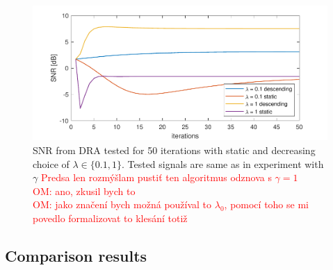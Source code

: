 \documentclass[conference]{IEEEtran}
\newcommand{\todo}[1]{\textcolor{red}{#1}}
\begin{document}
\begin{figure}[h]
	\centering
	\includegraphics[width=1\linewidth]{figures/lamda_desc}
	\caption{SNR from DRA tested for 50 iterations with static and decreasing choice of $\lambda \in \{0.1,1 \}$.
	Tested signals are same as in experiment with $\gamma$
	\todo{Predsa len rozmýšlam pustiť ten algoritmus odznova s $\gamma=1$}\\
	\todo{OM: ano, zkusil bych to}\\
	\todo{OM: jako značení bych možná používal to $\lambda_0$, pomocí toho se mi povedlo formalizovat to klesání totiž}}
	\label{fig:lamdadesc}
\end{figure}




\subsection{Comparison results}





\end{document}
